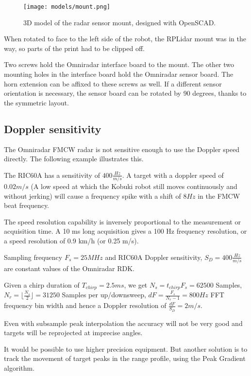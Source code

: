 \begin{figure}[htbp]
    \centering
    \label{fig:omniradar}
    \texttt{[image: models/mount.png]}
    \caption{3D model of the radar sensor mount, designed with OpenSCAD.}
\end{figure}

When rotated to face to the left side of the robot, the RPLidar mount
was in the way, so parts of the print had to be clipped off.

Two screws hold the Omniradar interface board to the mount. The other
two mounting holes in the interface board hold the Omniradar sensor
board. The horn extension can be affixed to these screws as well. If a
different sensor orientation is necessary, the sensor board can be
rotated by 90 degrees, thanks to the symmetric layout.

\subsection{Doppler sensitivity}\label{doppler-sensitivity}

The Omniradar FMCW radar is not sensitive enough to use the Doppler
speed directly. The following example illustrates this.

The RIC60A has a sensitivity of \(400 \frac{Hz}{m/s}\). A target with a
doppler speed of \(0.02 m/s\) (A low speed at which the Kobuki robot
still moves continuously and without jerking) will cause a frequency
spike with a shift of \(8Hz\) in the FMCW beat frequency.

The speed resolution capability is inversely proportional to the
measurement or acquisition time. A 10 ms long acquisition gives a 100 Hz
frequency resolution, or a speed resolution of 0.9 km/h (or 0.25 m/s).

Sampling frequency \(F_s=25MHz\) and RIC60A Doppler sensitivity,
\(S_D = 400 \frac{Hz}{m/s}\) are constant values of the Omniradar RDK.

Given a chirp duration of \(T_{chirp} = 2.5ms\), we get
\(N_s = t_{chirp} F_s = 62500\) Samples,
\(N_r = \lfloor \frac{N_s}{2} \rfloor = 31250\) Samples per
up/downsweep, \(dF = \frac{F_s}{N_r - 1} = 800 Hz\) FFT frequency bin
width and hence a Doppler resolution of \(\frac{dF}{S_D} = 2 m/s\).

Even with subsample peak interpolation the accuracy will not be very
good and targets will be reprojected at imprecise angles.

It would be possible to use higher precision equipment. But another
solution is to track the movement of target peaks in the range profile,
using the Peak Gradient algorithm.

